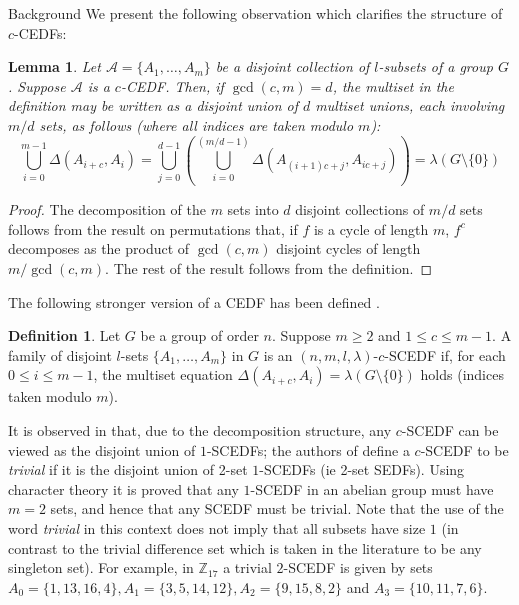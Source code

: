 \documentclass[12pt, a4paper]{article}
\newtheorem{lemma}[theorem]{Lemma}
\theoremstyle{definition}
\newtheorem{definition}[theorem]{Definition}
\begin{document}
\begin{section}{Background}
We present the following observation which clarifies the structure of $c$-CEDFs:
\begin{lemma}\label{lemma:CEDF}
Let $\mathcal{A}=\{A_1, \ldots, A_m\}$ be a disjoint collection of $l$-subsets of a group $G$. Suppose $\mathcal{A}$ is a $c$-CEDF.  Then, if $\gcd(c,m)=d$, the multiset in the definition may be written as a disjoint union of $d$ multiset unions, each involving $m/d$ sets, as follows (where all indices are taken modulo $m$):
$$ \bigcup_{i=0}^{m-1} \Delta(A_{i+c}, A_i)=\bigcup_{j=0}^{d-1} \left(\bigcup_{i=0}^{(m/d-1)} \Delta(A_{(i+1)c+j},A_{ic+j}) \right)=\lambda(G \setminus \{0\})$$
\end{lemma}
\begin{proof}
The decomposition of the $m$ sets into $d$ disjoint collections of $m/d$ sets follows from the result on permutations that, if $f$ is a cycle of length $m$, $f^c$ decomposes as the product of $\gcd(c,m)$ disjoint cycles of length $m/\gcd(c,m)$.  The rest of the result follows from the definition.
\end{proof}

The following stronger version of a CEDF has been defined \cite{VeiSti}.

\begin{definition}
Let $G$ be a group of order $n$. Suppose $m \geq 2$ and $1 \leq c \leq m-1$.   A family of disjoint $l$-sets $\{A_1, \ldots, A_m\}$ in $G$ is an $(n, m, l,\lambda)$-$c$-SCEDF if, for each $0 \leq i \leq m-1$, the multiset equation $\Delta(A_{i+c}, A_i)=\lambda (G \setminus \{0\})$ holds (indices taken modulo $m$).
\end{definition}

It is observed in \cite{WuYanFen} that, due to the decomposition structure, any $c$-SCEDF can be viewed as the disjoint union of $1$-SCEDFs; the authors of \cite{WuYanFen} define a $c$-SCEDF to be \emph{trivial} if it is the disjoint union of 2-set $1$-SCEDFs (ie 2-set SEDFs). Using character theory it is proved that any $1$-SCEDF in an abelian group must have $m=2$ sets, and hence that any SCEDF must be trivial.  Note that the use of the word \emph{trivial} in this context does not imply that all subsets have size $1$ (in contrast to the trivial difference set which is taken in the literature to be any singleton set).  For example, in $\mathbb{Z}_{17}$ a trivial $2$-SCEDF is given by sets $A_0=\{1,13,16, 4\}, A_1=\{3,5,14,12\}, A_2=\{9,15,8,2\}$ and $A_3=\{10,11,7,6\}$.
\end{section}
\end{document}
